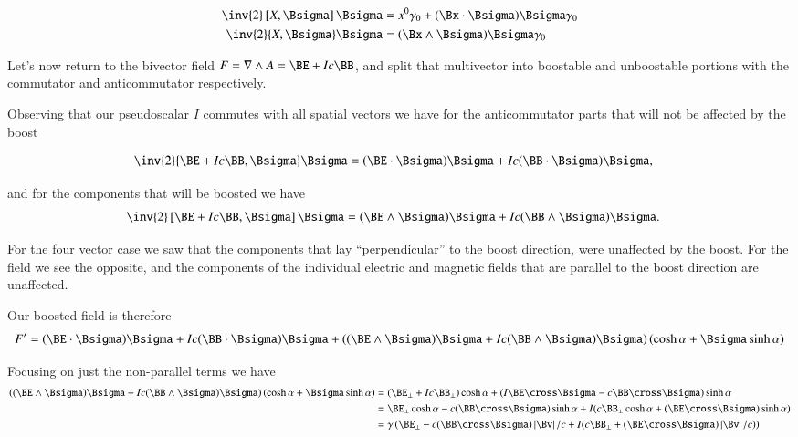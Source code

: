 \begin{align}\label{eqn:boostCommutator:15}
\inv{2} \antisymmetric{X}{\Bsigma} \Bsigma &= x^0 \gamma_0 + (\Bx \cdot \Bsigma) \Bsigma \gamma_0  \\
\inv{2} \symmetric{X}{\Bsigma} \Bsigma &= (\Bx \wedge \Bsigma) \Bsigma \gamma_0 
\end{align}

Let's now return to the bivector field $F = \grad \wedge A = \BE + I c \BB$, and split that multivector into boostable and unboostable portions with the commutator and anticommutator respectively.

Observing that our pseudoscalar $I$ commutes with all spatial vectors we have for the anticommutator parts that will not be affected by the boost

\begin{align}\label{eqn:boostCommutator:20}
\inv{2} \symmetric{\BE + I c \BB}{\Bsigma} \Bsigma &= (\BE \cdot \Bsigma) \Bsigma + I c (\BB \cdot \Bsigma) \Bsigma,
\end{align}

and for the components that will be boosted we have
\begin{align}\label{eqn:boostCommutator:21}
\inv{2} \antisymmetric{\BE + I c \BB}{\Bsigma} \Bsigma &= (\BE \wedge \Bsigma) \Bsigma + I c (\BB \wedge \Bsigma) \Bsigma.
\end{align}

For the four vector case we saw that the components that lay ``perpendicular'' to the boost direction, were unaffected by the boost.  For the field we see the opposite, and the components of the individual electric and magnetic fields that are parallel to the boost direction are unaffected.

Our boosted field is therefore
\begin{align}\label{eqn:boostCommutator:n}
F' = 
(\BE \cdot \Bsigma) \Bsigma + I c (\BB \cdot \Bsigma) \Bsigma
+ 
\left( 
(\BE \wedge \Bsigma) \Bsigma + I c (\BB \wedge \Bsigma) \Bsigma
\right) \left( \cosh \alpha + \Bsigma \sinh \alpha \right)
\end{align}

Focusing on just the non-parallel terms we have
\begin{align*}
\left( 
(\BE \wedge \Bsigma) \Bsigma + I c (\BB \wedge \Bsigma) \Bsigma
\right) \left( \cosh \alpha + \Bsigma \sinh \alpha \right)
&=
(\BE_\perp + I c \BB_\perp ) \cosh\alpha
+(I \BE \cross \Bsigma - c \BB \cross \Bsigma ) \sinh\alpha \\
&=
\BE_\perp \cosh\alpha - c (\BB \cross \Bsigma ) \sinh\alpha 
+ I ( c \BB_\perp \cosh\alpha + (\BE \cross \Bsigma) \sinh\alpha ) \\
&=
\gamma \left(
\BE_\perp - c (\BB \cross \Bsigma ) \Abs{\Bv}/c
+ I ( c \BB_\perp + (\BE \cross \Bsigma) \Abs{\Bv}/c) 
\right)
\end{align*}

